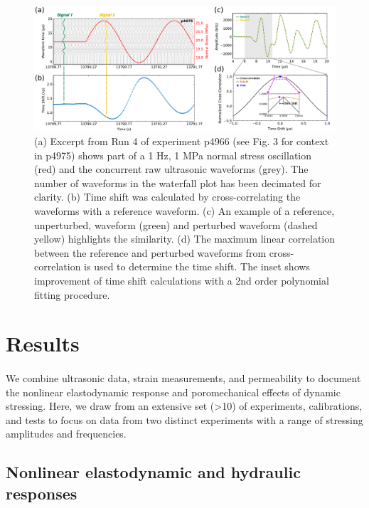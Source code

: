 \documentclass[letterpaper,10pt]{article}
\begin{document}
\newpage

\begin{figure}[ht]
	\centering
	\includegraphics[width=0.9 \columnwidth]{xcor_fig_v3}
	\caption[]{(a) Excerpt from Run 4 of experiment p4966 (see Fig. 3 for context in p4975) shows part of a 1 Hz, 1 MPa normal stress oscillation (red) and the concurrent raw ultrasonic waveforms (grey). The number of waveforms in the waterfall plot has been decimated for clarity. (b) Time shift was calculated by cross-correlating the waveforms with a reference waveform. (c) An example of a reference, unperturbed, waveform (green) and perturbed waveform (dashed yellow) highlights
		the similarity. (d) The maximum linear correlation between the reference and perturbed waveforms from cross-correlation is used to determine the time shift. The inset shows improvement of time shift calculations with a 2nd order polynomial fitting procedure.}
	\label{fig:xcor_poly}
\end{figure}

\newpage




\section{Results}
\paragraph{}
We combine ultrasonic data, strain measurements, and permeability to document the nonlinear elastodynamic response and poromechanical effects of dynamic stressing. Here, we draw from an extensive set (>10) of experiments, calibrations, and tests to focus on data from two distinct experiments with a range of stressing amplitudes and frequencies.

\subsection{Nonlinear elastodynamic and hydraulic responses}
\end{document}
